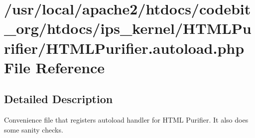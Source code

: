 \hypertarget{_h_t_m_l_purifier_8autoload_8php}{\section{/usr/local/apache2/htdocs/codebit\-\_\-org/htdocs/ips\-\_\-kernel/\-H\-T\-M\-L\-Purifier/\-H\-T\-M\-L\-Purifier.autoload.\-php File Reference}
\label{_h_t_m_l_purifier_8autoload_8php}
}


\subsection{Detailed Description}
Convenience file that registers autoload handler for H\-T\-M\-L Purifier. It also does some sanity checks. 